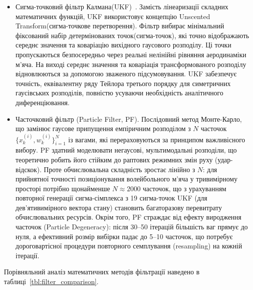\begin{itemize}
    Для балістичної моделі з квадратичним тертям та ефектом Магнуса
    аналітичне виведення приватних похідних Якобіана є надзвичайно
    громіздким. Більш того, якщо початковий гаусів розподіл пропускається через
    сильно нелінійну функцію, він перестає бути гаусовим. \gls{EKF} не враховує вищі
    члени ряду Тейлора, що призводить до систематичного заниження коваріації
    помилок та викликає розходження фільтра на крутих віражах траєкторії(в
    момент атакуючої дії/удару).
    \item Сигма-точковий фільтр Калмана(\gls{UKF})~\cite{julier_uhlmann,wan_vandermerwe,labbe_kalman}.
    Замість лінеаризації складних математичних функцій, \gls{UKF} використовує
    концепцію Unscented Transform(сигма-точкове перетворення). Фільтр вибирає
    мінімальний фіксований набір детермінованих точок(сигма-точок), які точно
    відображають середнє значення та коваріацію вихідного гаусового розподілу.
    Ці точки пропускаються безпосередньо через реальні нелінійні рівняння
    аеродинаміки м'яча. На виході середнє значення та коваріація
    трансформованого розподілу відновлюються за допомогою зваженого
    підсумовування. \gls{UKF} забезпечує точність, еквівалентну ряду Тейлора
    третього порядку для симетричних гаусівських розподілів, повністю
    усуваючи необхідність аналітичного диференціювання.
    \item Часточковий фільтр (Particle Filter, PF). Послідовний метод Монте-Карло,
    що замінює гаусове припущення емпіричним розподілом з $N$ часточок
    $\{x_k^{(i)}, w_k^{(i)}\}_{i=1}^{N}$ із вагами, які перераховуються за принципом
    важливісного вибору. PF здатний моделювати негаусові, мультимодальні
    розподіли, що теоретично робить його стійким до раптових режимних змін руху
    (удар-відскок). Проте обчислювальна складність зростає лінійно з $N$:
    для прийнятної точності позиціонування волейбольного м'яча у тривимірному
    просторі потрібно щонайменше $N \approx 2000$ часточок, що з урахуванням
    повторної генерації сигма-сімплекса з 19 сигма-точок \gls{UKF} (для
    дев'ятивимірного вектора стану) становить багаторазову перевитрату
    обчислювальних ресурсів. Окрім того,
    PF страждає від ефекту виродження часточок (Particle Degeneracy):
    після 30--50 ітерацій більшість ваг прямує до нуля, а ефективний розмір
    вибірки падає до 5--10 часточок, що потребує дороговартісної процедури
    повторного семплування (resampling) на кожній ітерації.
\end{itemize}

Порівняльний аналіз математичних методів фільтрації наведено в
таблиці~\ref{tbl:filter_comparison}.


